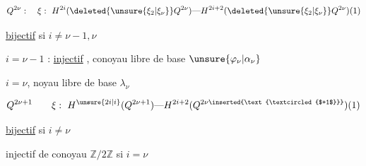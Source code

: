 \[
Q^{2\nu}:\quad \xi:\ H^{2i}(\deleted{\unsure{\xi_2|\xi_\nu}}Q^{2\nu})
\text{---}H^{2i+2}(\deleted{\unsure{\xi_2|\xi_\nu}}Q^{2\nu})(1)
\]
    
\uline{bijectif} si $i\neq\nu-1,\nu$

$i=\nu-1$ : \uline{injectif} , conoyau libre de base $\unsure{\varphi_\nu|\alpha_\nu}$

$i=\nu$\qquad {}, noyau libre de base $\lambda_\nu$

\[
Q^{2\nu+1}\qquad \xi:\ H^{\unsure{2i|i}}(Q^{2\nu+1})\text{---}
H^{2i+2}(Q^{2\nu\inserted{\text{\textcircled{$+1$}}}})(1)
\]

\uline{bijectif} si $i\neq\nu$

injectif de conoyau $\mathbb Z/2\mathbb Z$ si $i=\nu$
